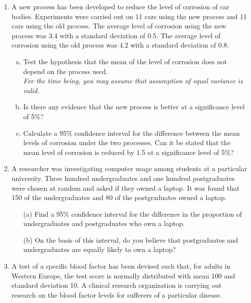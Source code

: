 \documentclass[]{article}
\begin{document}
\begin{enumerate}
\item
A new process has been developed to reduce the level of corrosion of car bodies. Experiments were carried out on 11 cars using the new process and 11 cars using the old process. The average level of corrosion using the new process was 3.4 with a standard deviation of 0.5. The average level of corrosion using the old process was 4.2 with a standard deviation of 0.8. 
\begin{enumerate}[(a)]
\item Test the hypothesis that the mean of the level of corrosion does not depend on the process used. \\ \textit{For the time being, you may assume that assumption of equal variance is valid. }
\item Is there any evidence that the new process is better at a significance level of 5\%?
\item Calculate a 95\% confidence interval for the difference between the mean levels of corrosion under the two processes. Can it be stated that the mean level of corrosion is reduced by 1.5 at a significance level of 5\%? 
\end{enumerate}


\item 
 A researcher was investigating computer usage among students at a particular university. Three hundred undergraduates and one hundred postgraduates were chosen at random and asked if they owned a laptop. It was found that 150 of the undergraduates and 80 of the postgraduates owned a laptop. 
\begin{itemize}
    \item[(a)]  Find a 95\% confidence interval for the difference in the proportion of undergraduates and postgraduates who own a laptop. 
    \item[(b)] On the basis of this interval, do you believe that postgraduates and undergraduates are equally likely to own a laptop? 
\end{itemize}

 


\item 
A test of a specific blood factor has been devised such that, for adults in Western Europe, the test score is normally distributed with mean 100 and standard deviation 10. A clinical research organization is carrying out research on the blood factor levels for sufferers of a particular disease.  


\end{enumerate}
\end{document}
